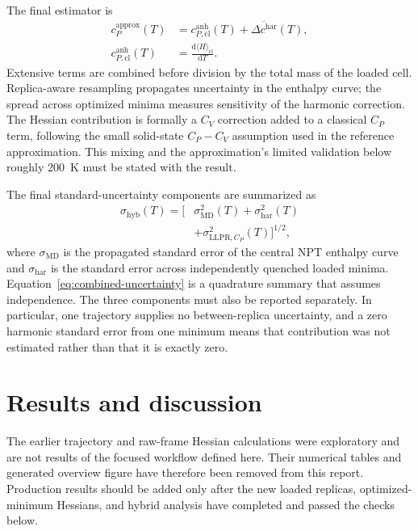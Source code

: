 \documentclass[10pt,a4paper,twocolumn]{article}
\newcommand{\cv}{\ensuremath{C_V}}
\newcommand{\cpheat}{\ensuremath{C_P}}
\begin{document}
The final estimator is
\begin{equation}
  \begin{aligned}
  c_P^{\mathrm{approx}}(T)
  &=c_{P,\mathrm{cl}}^{\mathrm{anh}}(T)
    +\overline{\Delta c^{\mathrm{har}}}(T),
  \\
  c_{P,\mathrm{cl}}^{\mathrm{anh}}(T)
  &=\frac{\mathrm d\langle H\rangle_{\mathrm{cl}}}{\mathrm dT}.
  \end{aligned}
  \label{eq:hybrid-cp}
\end{equation}
Extensive terms are combined before division by the total mass of the loaded
cell. Replica-aware resampling propagates uncertainty in the enthalpy curve;
the spread across optimized minima measures sensitivity of the harmonic
correction. The Hessian contribution is formally a \cv{} correction added to a
classical \cpheat{} term, following the small solid-state $C_P-C_V$ assumption
used in the reference approximation. This mixing and the approximation's
limited validation below roughly \SI{200}{K} must be stated with the result.

The final standard-uncertainty components are summarized as
\begin{equation}
  \begin{aligned}
  \sigma_{\mathrm{hyb}}(T)=\bigl[{}
    &\sigma_{\mathrm{MD}}^2(T)
    +\sigma_{\mathrm{har}}^2(T)
  \\
    &+\sigma_{\mathrm{LLPR},C_P}^2(T)\bigr]^{1/2},
  \end{aligned}
  \label{eq:combined-uncertainty}
\end{equation}
where $\sigma_{\mathrm{MD}}$ is the propagated standard error of the central
NPT enthalpy curve and $\sigma_{\mathrm{har}}$ is the standard error across
independently quenched loaded minima. Equation~\eqref{eq:combined-uncertainty}
is a quadrature summary that assumes independence. The three components must
also be reported separately. In particular, one trajectory supplies no
between-replica uncertainty, and a zero harmonic standard error from one
minimum means that contribution was not estimated rather than that it is
exactly zero.

\section{Results and discussion}
\label{sec:results}

The earlier trajectory and raw-frame Hessian calculations were exploratory and
are not results of the focused workflow defined here. Their numerical tables
and generated overview figure have therefore been removed from this report.
Production results should be added only after the new loaded replicas,
optimized-minimum Hessians, and hybrid analysis have completed and passed the
checks below.
\end{document}
